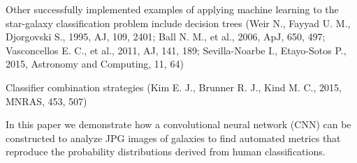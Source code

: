 Other successfully implemented examples of applying machine learning to the star-galaxy classification problem include decision trees (Weir N., Fayyad U. M., Djorgovski S., 1995, AJ, 109, 2401; Ball N. M., et al., 2006, ApJ, 650, 497; Vasconcellos E. C., et al., 2011, AJ, 141, 189; Sevilla-Noarbe I., Etayo-Sotos P., 2015, Astronomy and Computing, 11, 64)

Classifier combination strategies (Kim E. J., Brunner R. J., Kind M. C., 2015, MNRAS, 453, 507)

In this paper we demonstrate how a convolutional neural network (CNN) can be constructed to analyze JPG images of galaxies to find automated metrics that reproduce the probability distributions derived from human classifications.

